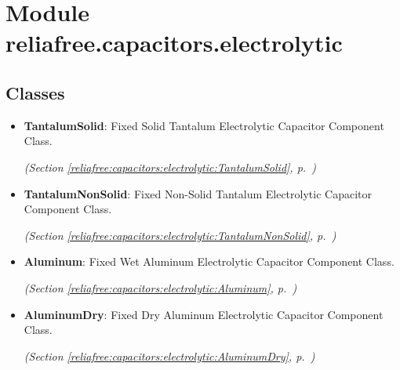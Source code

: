 %
%
%


\section{Module reliafree.capacitors.electrolytic}

    \label{reliafree:capacitors:electrolytic}


\subsection{Classes}

\begin{itemize}  \setlength{\parskip}{0ex}
  \item \textbf{TantalumSolid}: Fixed Solid Tantalum Electrolytic Capacitor Component Class.



  \textit{(Section \ref{reliafree:capacitors:electrolytic:TantalumSolid}, p.~\pageref{reliafree:capacitors:electrolytic:TantalumSolid})}

  \item \textbf{TantalumNonSolid}: Fixed Non-Solid Tantalum Electrolytic Capacitor Component Class.



  \textit{(Section \ref{reliafree:capacitors:electrolytic:TantalumNonSolid}, p.~\pageref{reliafree:capacitors:electrolytic:TantalumNonSolid})}

  \item \textbf{Aluminum}: Fixed Wet Aluminum Electrolytic Capacitor Component Class.



  \textit{(Section \ref{reliafree:capacitors:electrolytic:Aluminum}, p.~\pageref{reliafree:capacitors:electrolytic:Aluminum})}

  \item \textbf{AluminumDry}: Fixed Dry Aluminum Electrolytic Capacitor Component Class.



  \textit{(Section \ref{reliafree:capacitors:electrolytic:AluminumDry}, p.~\pageref{reliafree:capacitors:electrolytic:AluminumDry})}

\end{itemize}

